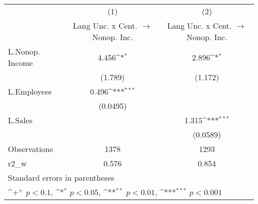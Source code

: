 {
\def\sym#1{\ifmmode^{#1}\else\(^{#1}\)\fi}
\begin{tabular}{l*{2}{c}}
\hline\hline
                    &\multicolumn{1}{c}{(1)}&\multicolumn{1}{c}{(2)}\\
                    &\multicolumn{1}{c}{Lang Unc. x Cent. $\rightarrow$ Nonop. Inc.}&\multicolumn{1}{c}{Lang Unc. x Cent. $\rightarrow$ Nonop. Inc.}\\
\hline
L.Nonop. Income     &       4.456\sym{*}  &       2.896\sym{*}  \\
                    &     (1.789)         &     (1.172)         \\
L.Employees         &       0.496\sym{***}&                     \\
                    &    (0.0495)         &                     \\
L.Sales             &                     &       1.315\sym{***}\\
                    &                     &    (0.0589)         \\
\hline
Observations        &        1378         &        1293         \\
r2\_w                &       0.576         &       0.854         \\
\hline\hline
\multicolumn{3}{l}{\footnotesize Standard errors in parentheses}\\
\multicolumn{3}{l}{\footnotesize \sym{+} \(p<0.1\), \sym{*} \(p<0.05\), \sym{**} \(p<0.01\), \sym{***} \(p<0.001\)}\\
\end{tabular}
}
